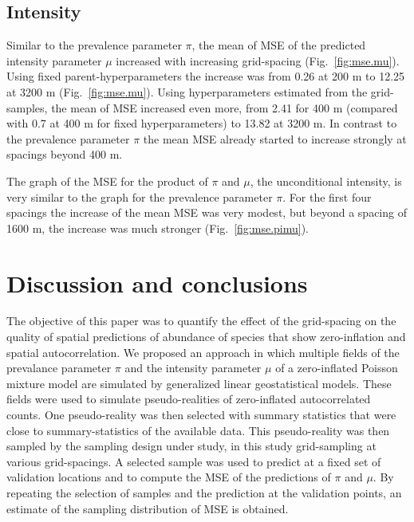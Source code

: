 \documentclass[review]{elsarticle}
\begin{document}
\subsection{Intensity}
Similar to the prevalence parameter $\pi$, the  mean of MSE of the predicted intensity parameter $\mu$ increased with increasing grid-spacing (Fig.~\ref{fig:mse.mu}). Using fixed parent-hyperparameters the increase was from 0.26 at 200 m to 12.25 at 3200 m (Fig.~\ref{fig:mse.mu}). Using hyperparameters estimated from the grid-samples, the mean of MSE increased even more, from 2.41 for 400 m (compared with 0.7 at 400 m for fixed hyperparameters) to 13.82 at 3200 m.  In contrast to the prevalence parameter $\pi$ the mean MSE already started to increase strongly at spacings beyond 400 m.

The  graph of the MSE for the product of $\pi$ and $\mu$, the unconditional intensity, is very similar to the graph for the prevalence parameter $\pi$. For the first four spacings the increase of the mean MSE was very modest, but beyond a spacing of 1600 m, the increase was much stronger (Fig.~\ref{fig:mse.pimu}).  

\section{Discussion and conclusions}\label{sec:discussion}
The objective of this paper was to quantify the effect of the grid-spacing on the quality of spatial predictions of abundance of species that show zero-inflation and spatial autocorrelation. We proposed an approach in which multiple fields of the prevalance parameter $\pi$ and the intensity parameter $\mu$ of a zero-inflated Poisson mixture model are simulated by generalized linear geostatistical models. These fields were used to simulate pseudo-realities of zero-inflated autocorrelated counts. One pseudo-reality was then selected with summary statistics that were close to summary-statistics of the available data. This pseudo-reality was then sampled by the sampling design under study, in this study grid-sampling at various grid-spacings. A selected sample was used to predict at a fixed set of validation locations and to compute the MSE of the predictions of $\pi$ and $\mu$. By repeating the selection of samples and the prediction at the validation points, an estimate of the sampling distribution of MSE is obtained.
\end{document}
